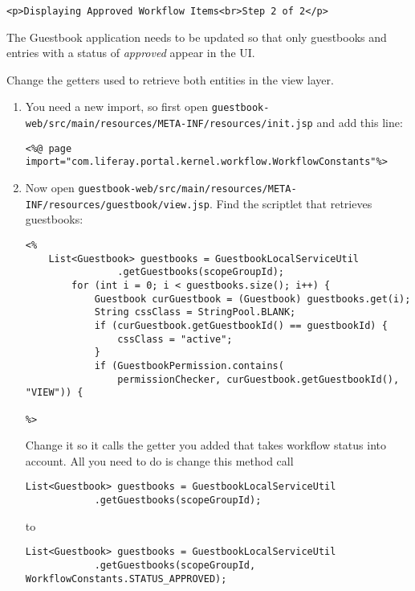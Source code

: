 \begin{verbatim}
<p>Displaying Approved Workflow Items<br>Step 2 of 2</p>
\end{verbatim}

The Guestbook application needs to be updated so that only guestbooks
and entries with a status of \emph{approved} appear in the UI.

Change the getters used to retrieve both entities in the view layer.

\begin{enumerate}
\def\labelenumi{\arabic{enumi}.}
\item
  You need a new import, so first open
  \texttt{guestbook-web/src/main/resources/META-INF/resources/init.jsp}
  and add this line:

\begin{verbatim}
<%@ page import="com.liferay.portal.kernel.workflow.WorkflowConstants"%>
\end{verbatim}
\item
  Now open
  \texttt{guestbook-web/src/main/resources/META-INF/resources/guestbook/view.jsp}.
  Find the scriptlet that retrieves guestbooks:

\begin{verbatim}
<%
    List<Guestbook> guestbooks = GuestbookLocalServiceUtil
                .getGuestbooks(scopeGroupId);
        for (int i = 0; i < guestbooks.size(); i++) {
            Guestbook curGuestbook = (Guestbook) guestbooks.get(i);
            String cssClass = StringPool.BLANK;
            if (curGuestbook.getGuestbookId() == guestbookId) {
                cssClass = "active";
            }
            if (GuestbookPermission.contains(
                permissionChecker, curGuestbook.getGuestbookId(), "VIEW")) {

%>
\end{verbatim}

  Change it so it calls the getter you added that takes workflow status
  into account. All you need to do is change this method call

\begin{verbatim}
List<Guestbook> guestbooks = GuestbookLocalServiceUtil
            .getGuestbooks(scopeGroupId);
\end{verbatim}

  to

\begin{verbatim}
List<Guestbook> guestbooks = GuestbookLocalServiceUtil
            .getGuestbooks(scopeGroupId, WorkflowConstants.STATUS_APPROVED);
\end{verbatim}


\end{enumerate}
